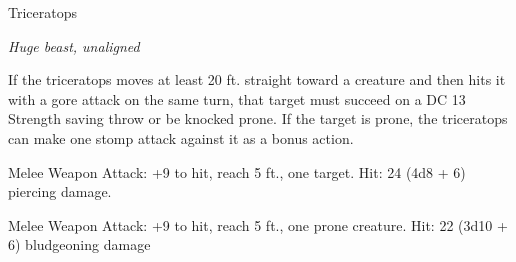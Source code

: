 \begin{monsterbox}{Triceratops}
\begin{hangingpar}
\textit{Huge beast, unaligned}
\end{hangingpar}
\dndline%
\basics[%
armorclass = 13,
hitpoints = 10d12 + 30,
speed = {50 ft.}
]
\dndline%
\stats[%
STR = \stat{22},
DEX = \stat{9},
CON = \stat{17},
INT = \stat{2},
WIS = \stat{11},
CHA = \stat{5}
]
\dndline%
\details[%
skills={},
damageimmunities={},
savingthrows={},
conditionimmunities={},
damageresistances={},
damagevulnerabilities={},
senses={passive Perception 10},
challenge=5
]
\dndline%
\begin{monsteraction}
If the triceratops moves at least 20 ft. straight toward a creature and then hits it with a gore attack on the same turn, that target must succeed on a DC 13 Strength saving throw or be knocked prone. If the target is prone, the triceratops can make one stomp attack against it as a bonus action.
\end{monsteraction}
\begin{monsteraction}[Gore]
Melee Weapon Attack: +9 to hit, reach 5 ft., one target. Hit: 24 (4d8 + 6) piercing damage.
\end{monsteraction}
\begin{monsteraction}[Stomp]
Melee Weapon Attack: +9 to hit, reach 5 ft., one prone creature. Hit: 22 (3d10 + 6) bludgeoning damage
\end{monsteraction}
\end{monsterbox}